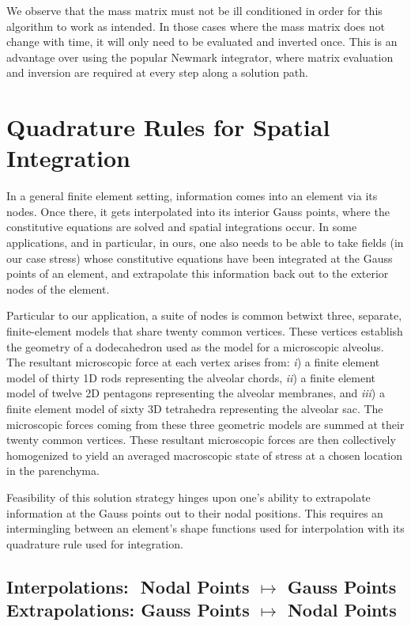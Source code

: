 We observe that the mass matrix must not be ill conditioned in order for this algorithm to work as intended.  In those cases where the mass matrix does not change with time, it will only need to be evaluated and inverted once.  This is an advantage over using the popular Newmark \cite{Newmark59} integrator, where matrix evaluation and inversion are required at every step along a solution path.


\section{Quadrature Rules for Spatial Integration}
\label{sec:Gauss}

In a general finite element setting, information comes into an element via its nodes.  Once there, it gets interpolated into its interior Gauss points, where the constitutive equations are solved and spatial integrations occur.  In some applications, and in particular, in ours, one also needs to be able to take fields (in our case stress) whose constitutive equations have been integrated at the Gauss points of an element, and extrapolate this information back out to the exterior nodes of the element.

Particular to our application, a suite of nodes is common betwixt three, separate, finite-element models that share twenty common vertices.  These vertices establish the geometry of a dodecahedron used as the model for a micro\-scopic alveolus.  The resultant micro\-scopic force at each vertex arises from: \textit{i\/}) a finite element model of thirty 1D rods representing the alveolar chords, \textit{ii\/}) a finite element model of twelve 2D pentagons representing the alveolar membranes, and \textit{iii\/}) a finite element model of sixty 3D tetrahedra representing the alveolar sac.  The micro\-scopic forces coming from these three geometric models are summed at their twenty common vertices. These resultant micro\-scopic forces are then collectively homo\-genized to yield an averaged macro\-scopic state of stress at a chosen location in the parenchyma.  

Feasibility of this solution strategy hinges upon one's ability to extrapolate information at the Gauss points out to their nodal positions.  This requires an intermingling between an element's shape functions used for interpolation with its quadrature rule used for integration.

\subsection{Interpolations:\,\, Nodal Points $\mapsto$ Gauss Points \\ 
    \qquad\quad Extrapolations: Gauss Points $\mapsto$ Nodal Points}
\label{sec:extrapolation}

